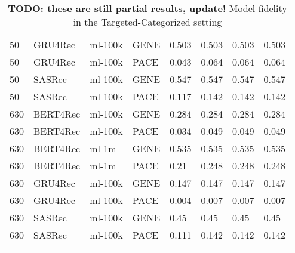 \begin{longtable}{|l|l|l|l|l|l|l|l|}
50 & GRU4Rec & ml-100k & GENE & 0.503 & 0.503 & 0.503 & 0.503 \\
50 & GRU4Rec & ml-100k & PACE & 0.043 & 0.064 & 0.064 & 0.064 \\\hline
50 & SASRec & ml-100k & GENE & 0.547 & 0.547 & 0.547 & 0.547 \\
50 & SASRec & ml-100k & PACE & 0.117 & 0.142 & 0.142 & 0.142 \\\hline
630 & BERT4Rec & ml-100k & GENE & 0.284 & 0.284 & 0.284 & 0.284 \\
630 & BERT4Rec & ml-100k & PACE & 0.034 & 0.049 & 0.049 & 0.049 \\\hline
630 & BERT4Rec & ml-1m & GENE & 0.535 & 0.535 & 0.535 & 0.535 \\
630 & BERT4Rec & ml-1m & PACE & 0.21 & 0.248 & 0.248 & 0.248 \\\hline
630 & GRU4Rec & ml-100k & GENE & 0.147 & 0.147 & 0.147 & 0.147 \\
630 & GRU4Rec & ml-100k & PACE & 0.004 & 0.007 & 0.007 & 0.007 \\\hline
630 & SASRec & ml-100k & GENE & 0.45 & 0.45 & 0.45 & 0.45 \\
630 & SASRec & ml-100k & PACE & 0.111 & 0.142 & 0.142 & 0.142 \\\hline
\caption{\textbf{TODO: these are still partial results, update!} Model fidelity in the Targeted-Categorized setting}
    \label{tab:eval_targ_cat}
    \end{longtable}
    \endgroup